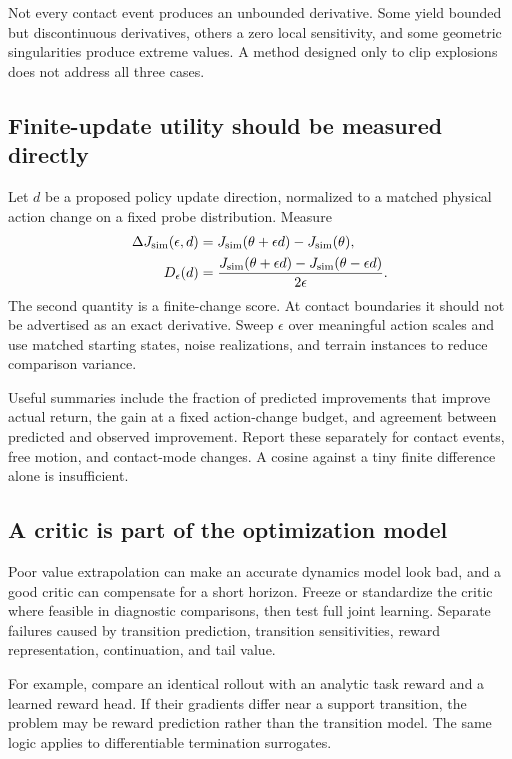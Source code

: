 Not every contact event produces an unbounded derivative. Some yield bounded
but discontinuous derivatives, others a zero local sensitivity, and some
geometric singularities produce extreme values. A method designed only to
clip explosions does not address all three cases.

\subsection{Finite-update utility should be measured directly}
Let $d$ be a proposed policy update direction, normalized to a matched physical
action change on a fixed probe distribution. Measure
\begin{align}
\Delta J_{\rm sim}(\epsilon,d)&=J_{\rm sim}(\theta+\epsilon d)-J_{\rm sim}(\theta),\\
D_{\epsilon}(d)&=\frac{J_{\rm sim}(\theta+\epsilon d)-J_{\rm sim}(\theta-\epsilon d)}{2\epsilon}.
\end{align}
The second quantity is a finite-change score. At contact boundaries it should
not be advertised as an exact derivative. Sweep $\epsilon$ over meaningful
action scales and use matched starting states, noise realizations, and terrain
instances to reduce comparison variance.

Useful summaries include the fraction of predicted improvements that improve
actual return, the gain at a fixed action-change budget, and agreement between
predicted and observed improvement. Report these separately for contact events,
free motion, and contact-mode changes. A cosine against a tiny finite difference
alone is insufficient.

\subsection{A critic is part of the optimization model}
Poor value extrapolation can make an accurate dynamics model look bad, and a
good critic can compensate for a short horizon. Freeze or standardize the critic
where feasible in diagnostic comparisons, then test full joint learning.
Separate failures caused by transition prediction, transition sensitivities,
reward representation, continuation, and tail value.

For example, compare an identical rollout with an analytic task reward and a
learned reward head. If their gradients differ near a support transition, the
problem may be reward prediction rather than the transition model. The same
logic applies to differentiable termination surrogates.

